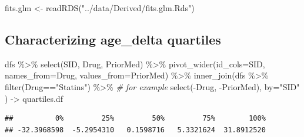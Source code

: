 \documentclass[
]{article}
\newenvironment{Shaded}{\begin{snugshade}}{\end{snugshade}}
\newcommand{\AttributeTok}[1]{\textcolor[rgb]{0.77,0.63,0.00}{#1}}
\newcommand{\CommentTok}[1]{\textcolor[rgb]{0.56,0.35,0.01}{\textit{#1}}}
\newcommand{\DecValTok}[1]{\textcolor[rgb]{0.00,0.00,0.81}{#1}}
\newcommand{\FloatTok}[1]{\textcolor[rgb]{0.00,0.00,0.81}{#1}}
\newcommand{\FunctionTok}[1]{\textcolor[rgb]{0.00,0.00,0.00}{#1}}
\newcommand{\NormalTok}[1]{#1}
\newcommand{\OtherTok}[1]{\textcolor[rgb]{0.56,0.35,0.01}{#1}}
\newcommand{\SpecialCharTok}[1]{\textcolor[rgb]{0.00,0.00,0.00}{#1}}
\newcommand{\StringTok}[1]{\textcolor[rgb]{0.31,0.60,0.02}{#1}}
\begin{document}
\begin{Shaded}
\begin{Highlighting}[]
\NormalTok{fits.glm }\OtherTok{\textless{}{-}} \FunctionTok{readRDS}\NormalTok{(}\StringTok{"../data/Derived/fits.glm.Rds"}\NormalTok{)}
\end{Highlighting}
\end{Shaded}

\hypertarget{characterizing-age_delta-quartiles}{%
\subsection{Characterizing age\_delta
quartiles}\label{characterizing-age_delta-quartiles}}

\begin{Shaded}
\begin{Highlighting}[]
\NormalTok{dfs }\SpecialCharTok{\%\textgreater{}\%} 
  \FunctionTok{select}\NormalTok{(SID, Drug, PriorMed) }\SpecialCharTok{\%\textgreater{}\%} 
  \FunctionTok{pivot\_wider}\NormalTok{(}\AttributeTok{id\_cols=}\NormalTok{SID,}
              \AttributeTok{names\_from=}\NormalTok{Drug,}
              \AttributeTok{values\_from=}\NormalTok{PriorMed) }\SpecialCharTok{\%\textgreater{}\%} 
  \FunctionTok{inner\_join}\NormalTok{(dfs }\SpecialCharTok{\%\textgreater{}\%} 
               \FunctionTok{filter}\NormalTok{(Drug}\SpecialCharTok{==}\StringTok{"Statins"}\NormalTok{) }\SpecialCharTok{\%\textgreater{}\%} \CommentTok{\# for example}
               \FunctionTok{select}\NormalTok{(}\SpecialCharTok{{-}}\NormalTok{Drug, }\SpecialCharTok{{-}}\NormalTok{PriorMed),}
               \AttributeTok{by=}\StringTok{"SID"}
\NormalTok{               ) }\OtherTok{{-}\textgreater{}}
\NormalTok{  quartiles.df}
\end{Highlighting}
\end{Shaded}

\begin{Shaded}
\end{Shaded}

\begin{verbatim}
##          0%         25%         50%         75%        100% 
## -32.3968598  -5.2954310   0.1598716   5.3321624  31.8912520
\end{verbatim}
\end{document}
